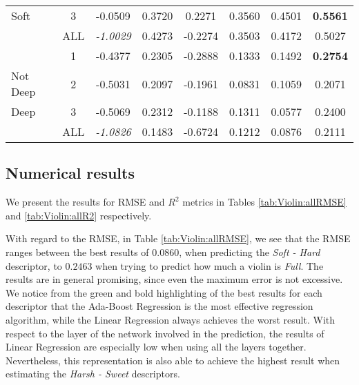 \begin{table}[tbp]
\begin{tabular}{||l|c|c|c|c|c|c|c||}
Soft & 3 & -0.0509 & 0.3720 & 0.2271 & 0.3560 & 0.4501 & \color[HTML]{326B00}\textbf{0.5561} \\
 & ALL & \color[HTML]{8E0000}\textit{-1.0029} & 0.4273 & -0.2274 & 0.3503 & 0.4172 & 0.5027 \\
\hline
\hline
 & 1 & -0.4377 & 0.2305 & -0.2888 & 0.1333 & 0.1492 & \color[HTML]{326B00}\textbf{0.2754} \\
Not Deep & 2 & -0.5031 & 0.2097 & -0.1961 & 0.0831 & 0.1059 & 0.2071 \\
Deep & 3 & -0.5069 & 0.2312 & -0.1188 & 0.1311 & 0.0577 & 0.2400 \\
 & ALL & \color[HTML]{8E0000}\textit{-1.0826} & 0.1483 & -0.6724 & 0.1212 & 0.0876 & 0.2111 \\
\hline
\hline
\end{tabular}
\egroup
\end{table}


\subsection{Numerical results} 
We present the results for RMSE and $R^2$ metrics in Tables \ref{tab:Violin:allRMSE} and \ref{tab:Violin:allR2} respectively. 

With regard to the RMSE, in Table \ref{tab:Violin:allRMSE}, we see that the RMSE ranges between the best results of $0.0860$, when predicting the \textit{Soft - Hard} descriptor, to $0.2463$ when trying to predict how much a violin is \textit{Full}. The results are in general promising, since even the maximum error is not excessive. We notice from the green and bold highlighting of the best results for each descriptor that the Ada-Boost Regression is the most effective regression algorithm, while the Linear Regression always achieves the worst result. With respect to the layer of the network involved in the prediction, the results of Linear Regression are especially low when using all the layers together. Nevertheless, this representation is also able to achieve the highest result when estimating the \textit{Harsh - Sweet} descriptors.

